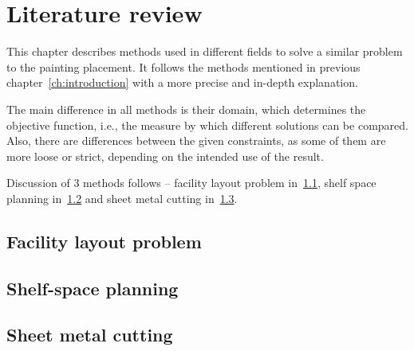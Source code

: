\chapter{Literature review}\label{ch:literature-review}

This chapter describes methods used in different fields to solve a similar problem to the
painting placement. It follows the methods mentioned in previous chapter~\ref{ch:introduction} with
a more precise and in-depth explanation.

The main difference in all methods is their domain, which determines the objective function, i.e.,
the measure by which different solutions can be compared.
Also, there are differences between the given constraints, as some of them are more loose or strict,
depending on the intended use of the result.

Discussion of 3 methods follows – facility layout problem in~\ref{sec:facility-layout-problem},
shelf space planning in~\ref{sec:shelf-space-planning} and sheet metal cutting in~\ref{sec:sheet-metal-cutting}.


\section{Facility layout problem}\label{sec:facility-layout-problem}


\section{Shelf-space planning}\label{sec:shelf-space-planning}


\section{Sheet metal cutting}\label{sec:sheet-metal-cutting}

%


